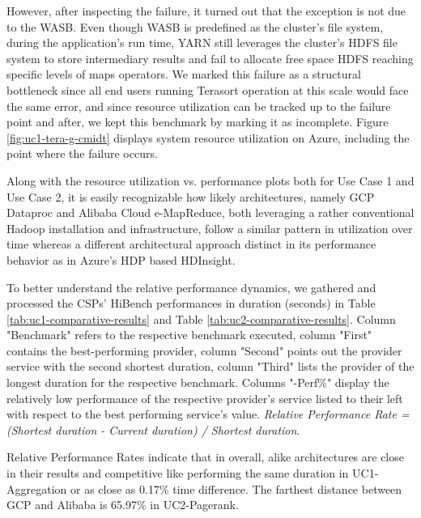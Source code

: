 \documentclass[review]{elsarticle}
\begin{document}
	However, after inspecting the failure, it turned out that the exception is not due to the WASB. Even though WASB is predefined as the cluster's file system, during the application's run time, YARN still leverages the cluster's HDFS file system to store intermediary results and fail to allocate free space HDFS reaching specific levels of maps operators. We marked this failure as a structural bottleneck since all end users running Terasort operation at this scale would face the same error, and since resource utilization can be tracked up to the failure point and after, we kept this benchmark by marking it as incomplete. Figure \ref{fig:uc1-tera-g-cmidt} displays system resource utilization on Azure, including the point where the failure occurs.
	
	Along with the resource utilization vs. performance plots both for Use Case 1 and Use Case 2, it is easily recognizable how likely architectures, namely GCP Dataproc and Alibaba Cloud e-MapReduce, both leveraging a rather conventional Hadoop installation and infrastructure, follow a similar pattern in utilization over time whereas a different architectural approach distinct in its performance behavior as in Azure's HDP based HDInsight. 
	
	To better understand the relative performance dynamics, we gathered and processed the CSPs' HiBench performances in duration (seconds) in Table \ref{tab:uc1-comparative-results} and Table \ref{tab:uc2-comparative-results}. Column "Benchmark" refers to the respective benchmark executed, column "First" contains the best-performing provider, column "Second" points out the provider service with the second shortest duration, column "Third" lists the provider of the longest duration for the respective benchmark. Columns "-Perf\%" display the relatively low performance of the respective provider's service listed to their left with respect to the best performing service's value. \textit{Relative Performance Rate = (Shortest duration - Current duration) / Shortest duration}. 
	
	Relative Performance Rates indicate that in overall, alike architectures are close in their results and competitive like performing the same duration in UC1-Aggregation or as close as 0.17\% time difference. The farthest distance between GCP and Alibaba is 65.97\% in UC2-Pagerank.
	
	
	
\end{document}

